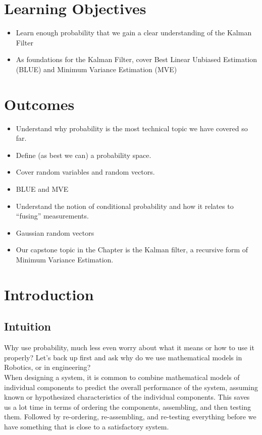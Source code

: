\section*{Learning Objectives}

\begin{itemize}
\item Learn enough probability that we gain a clear understanding of the Kalman Filter
\item As foundations for the Kalman Filter, cover Best Linear Unbiased Estimation (BLUE) and Minimum Variance Estimation (MVE)
\end{itemize}

\section*{Outcomes} 
\begin{itemize}
\item Understand why probability is the most technical topic we have covered so far.
\item Define (as best we can) a probability space.
\item Cover random variables and random vectors.
\item BLUE and MVE
\item Understand the notion of conditional probability and how it relates to ``fusing'' measurements.
\item Gaussian random vectors
\item Our capstone topic in the Chapter is the Kalman filter, a recursive form of Minimum Variance Estimation.
\end{itemize}



\section{Introduction}

\subsection{Intuition} Why use probability, much less even worry about what it means or how to use it properly? Let's back up first and ask why do we use mathematical models in Robotics, or in engineering? \\

When designing a system, it is common to combine mathematical models of individual components to predict the overall performance of the system, assuming known or hypothesized characteristics of the individual components. This saves us a lot time in terms of ordering the components, assembling, and then testing them. Followed by re-ordering, re-assembling, and re-testing everything before we have something that is close to a satisfactory system.\\

